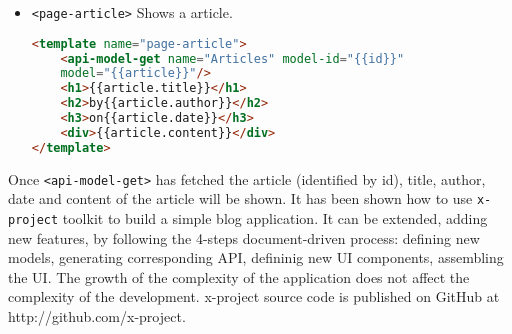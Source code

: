 \begin{itemize} \item \texttt{<page-article>} Shows a article.
\begin{lstlisting}[language=html]
<template name="page-article">
	<api-model-get name="Articles" model-id="{{id}}"
	model="{{article}}"/>
	<h1>{{article.title}}</h1>
	<h2>by{{article.author}}</h2>
	<h3>on{{article.date}}</h3>
	<div>{{article.content}}</div>
</template>
\end{lstlisting}
\end{itemize}

Once \texttt{<api-model-get>} has fetched the article (identified by id), title, author, date and content of the article will be shown. It has been shown how to use \texttt{x-project} toolkit to build a simple blog application. It can be extended, adding new features, by following the 4-steps document-driven process: defining new models, generating corresponding API, defininig new UI components, assembling the UI. The growth of the complexity of the application does not affect the complexity of the development. x-project source code is published on GitHub at http://github.com/x-project.

